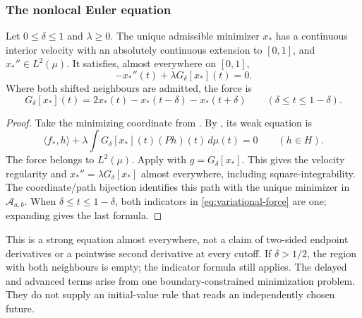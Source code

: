 \subsubsection{The nonlocal Euler equation}
\label{sec:variational-euler}

\begin{theorem}
\label{thm:nonlocal-euler}
Let $0\le\delta\le1$ and $\lambda\ge0$. The unique admissible
minimizer $x_*$ has a continuous interior velocity with an
absolutely continuous extension to $[0,1]$, and $x_*''\in L^2(\mu)$.
It satisfies, almost everywhere on $[0,1]$,
\begin{equation}\label{eq:nonlocal-euler}
 -x_*''(t)+\lambda G_\delta[x_*](t)=0.
\end{equation}
Where both shifted neighbours are admitted, the force is
\[
 G_\delta[x_*](t)=2x_*(t)-x_*(t-\delta)-x_*(t+\delta)
 \qquad(\delta\le t\le1-\delta).
\]
\end{theorem}
\begin{proof}
Take the minimizing coordinate from .
By , its weak equation is
\[
 \langle f_*,h\rangle+\lambda\int
 G_\delta[x_*](t)(Ph)(t)\,d\mu(t)=0\qquad(h\in H).
\]
The force belongs to $L^2(\mu)$. Apply
 with $g=G_\delta[x_*]$.
This gives the velocity regularity and
$x_*''=\lambda G_\delta[x_*]$ almost everywhere, including
square-integrability. The coordinate/path bijection identifies
this path with the unique minimizer in $\mathcal A_{a,b}$.
When $\delta\le t\le1-\delta$, both indicators in
\eqref{eq:variational-force} are one; expanding gives the last formula.
\end{proof}

This is a strong equation almost everywhere, not a claim of two-sided
endpoint derivatives or a pointwise second derivative at every cutoff.
If $\delta>1/2$, the region with both neighbours is empty; the
indicator formula still applies. The delayed and advanced terms arise
from one boundary-constrained minimization problem. They do not supply
an initial-value rule that reads an independently chosen future.
